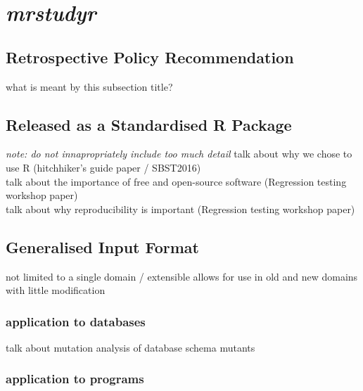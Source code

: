 \section{\textit{mrstudyr}}
\subsection{Retrospective Policy Recommendation}
what is meant by this subsection title?

\subsection{Released as a Standardised R Package}
\textit{note: do not innapropriately include too much detail}
talk about why we chose to use R (hitchhiker's guide paper / SBST2016)\\
talk about the importance of free and open-source software (Regression testing workshop paper)\\
talk about why reproducibility is important (Regression testing workshop paper)

\subsection{Generalised Input Format}
not limited to a single domain / extensible
allows for use in old and new domains with little modification
    \subsubsection{application to databases}
    talk about mutation analysis of database schema mutants
    \subsubsection{application to programs}
